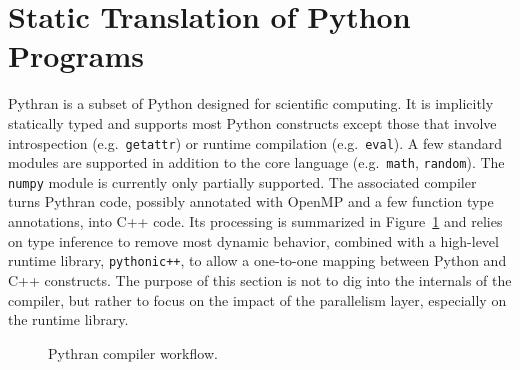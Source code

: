 \documentclass{llncs}
\begin{document}
\section{Static Translation of Python Programs}\label{sec:python-static}

Pythran is a subset of Python designed for scientific computing. It is
implicitly statically typed and supports most Python constructs except those
that involve introspection (e.g.\ \texttt{getattr}) or runtime compilation
(e.g.\ \texttt{eval}). A few standard modules are supported in addition to the
core language (e.g.\ \texttt{math}, \texttt{random}). The \texttt{numpy} module
is currently only partially supported. The associated compiler turns Pythran
code, possibly annotated with OpenMP and a few function type annotations, into
C++ code. Its processing is summarized in Figure~\ref{fig:pythran-compiler} and
relies on type inference to remove most dynamic behavior, combined with a
high-level runtime library, \texttt{pythonic++}, to allow a one-to-one mapping
between Python and C++ constructs. The purpose of this section is not to dig
into the internals of the compiler, but rather to focus on the impact of the
parallelism layer, especially on the runtime library.

\begin{figure}

\centering
{}
\caption{Pythran compiler workflow.}
\label{fig:pythran-compiler}
\end{figure}
\end{document}
